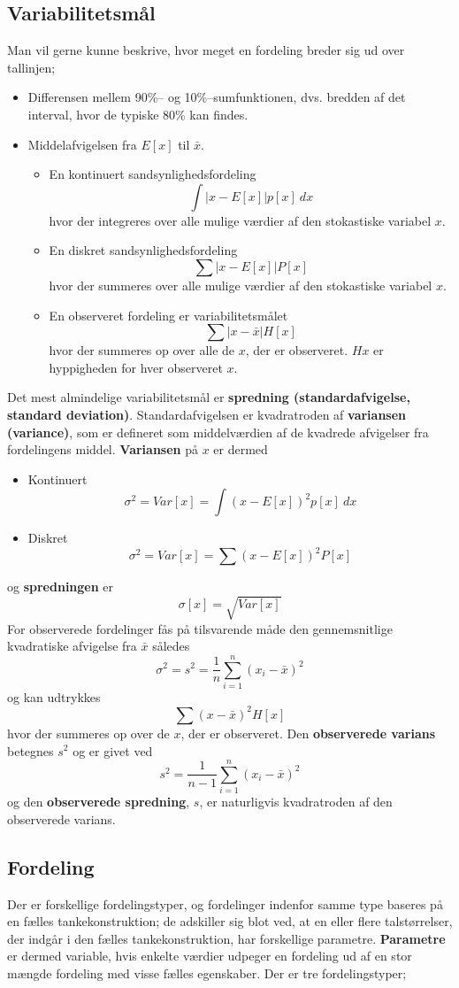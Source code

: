 \documentclass[11pt]{article}
\begin{document}
\subsection{Variabilitetsmål}
Man vil gerne kunne beskrive, hvor meget en fordeling breder sig ud over tallinjen;
\begin{itemize}\itemsep-2pt
\item Differensen mellem 90\%-- og 10\%--sumfunktionen, dvs. bredden af det interval, hvor de typiske 80\% kan findes.
\item Middelafvigelsen fra $E[x]$ til $\bar{x}$.
\begin{itemize}\itemsep-2pt
\item En kontinuert sandsynlighedsfordeling
$$\int|x-E[x]|p[x]\:dx$$
hvor der integreres over alle mulige værdier af den stokastiske variabel $x$.
\item En diskret sandsynlighedsfordeling
$$\sum|x-E[x]|P[x]$$
hvor der summeres over alle mulige værdier af den stokastiske variabel $x$.
\item En observeret fordeling er variabilitetsmålet
$$\sum|x-\bar{x}|H[x]$$
hvor der summeres op over alle de $x$, der er observeret. $H{x}$ er hyppigheden for hver observeret $x$. 
\end{itemize}
\end{itemize}
Det mest almindelige variabilitetsmål er \textbf{spredning (standardafvigelse, standard deviation)}. Standardafvigelsen er kvadratroden af \textbf{variansen (variance)}, som er defineret som middelværdien af de kvadrede afvigelser fra fordelingens middel. \textbf{Variansen} på $x$ er dermed
\begin{itemize}\itemsep-2pt
\item Kontinuert
$$\sigma^2=Var[x]=\int(x-E[x])^2p[x]\:dx$$
\item Diskret
$$\sigma^2=Var[x]=\sum(x-E[x])^2P[x]$$
\end{itemize}
og \textbf{spredningen} er
$$\sigma[x]=\sqrt{Var[x]}$$
For observerede fordelinger fås på tilsvarende måde den gennemsnitlige kvadratiske afvigelse fra $\bar{x}$ således
$$\sigma^2=s^2=\frac{1}{n}\sum^n_{i=1}(x_i-\bar{x})^2$$
og kan udtrykkes
$$\sum(x-\bar{x})^2H[x]$$
hvor der summeres op over de $x$, der er observeret. Den \textbf{observerede varians} betegnes $s^2$ og er givet ved
$$s^2=\frac{1}{n-1}\sum^n_{i=1}(x_i-\bar{x})^2$$
og den \textbf{observerede spredning}, $s$, er naturligvis kvadratroden af den observerede varians.
\subsection{Fordeling}
Der er forskellige fordelingstyper, og fordelinger indenfor samme type baseres på en fælles tankekonstruktion; de adskiller sig blot ved, at en eller flere talstørrelser, der indgår i den fælles tankekonstruktion, har forskellige parametre. \textbf{Parametre} er dermed variable, hvis enkelte værdier udpeger en fordeling ud af en stor mængde fordeling med visse fælles egenskaber. Der er tre fordelingstyper; 
\end{document}
